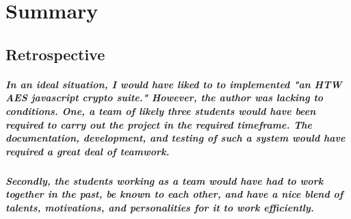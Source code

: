\chapter{Summary}

\section{Retrospective}
\paragraph{In an ideal situation, I would have liked to to implemented "an HTW AES javascript crypto suite." However, the author was lacking to conditions. One, a team of likely three students would have been required to carry out the project in the required timeframe. The documentation, development, and testing of such a system would have required a great deal of teamwork.}

\paragraph{Secondly, the students working as a team would have had to work together in the past, be known to each other, and have a nice blend of talents, motivations, and personalities for it to work efficiently.}
